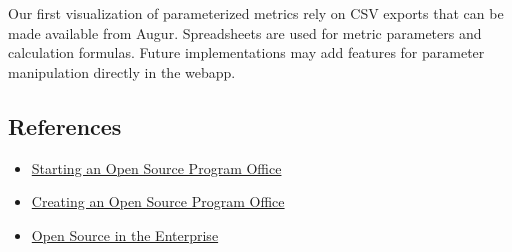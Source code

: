 Our first visualization of parameterized metrics rely on CSV exports
that can be made available from Augur. Spreadsheets are used for metric
parameters and calculation formulas. Future implementations may add
features for parameter manipulation directly in the webapp.

\hypertarget{references}{%
\subsection{References}\label{references}}

\begin{itemize}
\tightlist
\item
  \href{https://www.slideshare.net/caniszczyk/starting-an-open-source-program-office-ospo}{Starting
  an Open Source Program Office}
\item
  \href{https://events19.linuxfoundation.org/wp-content/uploads/2018/07/OSLS_2019-untold-story-of-OSPO.pdf}{Creating
  an Open Source Program Office}
\item
  \href{https://d1.awsstatic.com/Open\%20Source/enterprise-oss-book.pdf}{Open
  Source in the Enterprise}
\end{itemize}
